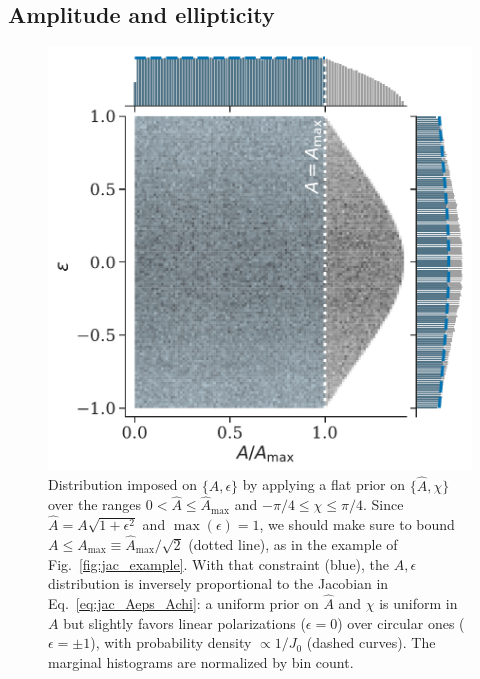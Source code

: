 \documentclass[aps,prd,twocolumn,superscriptaddress,preprintnumbers,floatfix,nofootinbib]{revtex4-2}
\newcommand*{\eq}[1]{Eq.~\eqref{eq:#1}}
\begin{document}
\subsection{Amplitude and ellipticity}
\label{sec:jac:Achi}

\begin{figure}
\includegraphics[width=0.8\columnwidth]{jac_Aeps_Achi}
\caption{Distribution imposed on $\{A,\epsilon\}$ by applying a flat prior on $\{\hat{A},\chi\}$ over the ranges $0 < \hat{A} \leq \hat{A}_{\max}$ and $-\pi/4 \leq \chi \leq \pi/4$.
Since $\hat{A} = A \sqrt{1+\epsilon^2}$ and $\max(\epsilon)= 1$, we should make sure to bound $A \leq  A_{\max} \equiv \hat{A}_{\max} /\sqrt{2}$ (dotted line), as in the example of Fig.~\ref{fig:jac_example}.
With that constraint (blue), the $A,\epsilon$ distribution is inversely proportional to the Jacobian in \eq{jac_Aeps_Achi}: a uniform prior on $\hat{A}$ and $\chi$ is uniform in $A$ but slightly favors linear polarizations ($\epsilon = 0$) over circular ones ($\epsilon = \pm 1$), with probability density $\propto 1/J_0$ (dashed curves). 
The marginal histograms are normalized by bin count.
}
\label{fig:jac_Aeps_Achi}
\end{figure}
\end{document}
